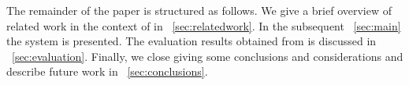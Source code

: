 The remainder of the paper is structured as follows.
We give a brief overview of related work in the context of 
  in \sectionname~\ref{sec:relatedwork}.
In the subsequent \sectionname~\ref{sec:main} the
     system is presented.
The evaluation results obtained from  is discussed in
  \sectionname~\ref{sec:evaluation}.
Finally, we close giving some conclusions and considerations
  and describe future work in \sectionname~\ref{sec:conclusions}.
